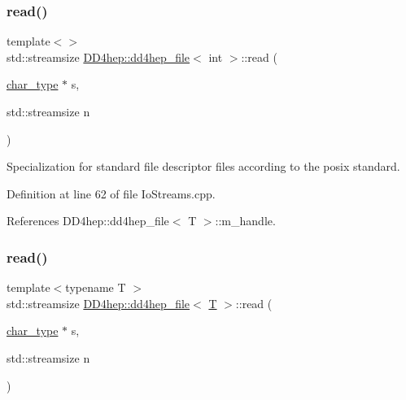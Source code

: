 \hypertarget{class_d_d4hep_1_1dd4hep__file_ac00bb0ccc6724f941f071fb9d2ea76c4}{}\label{class_d_d4hep_1_1dd4hep__file_ac00bb0ccc6724f941f071fb9d2ea76c4} 
\subsubsection{\texorpdfstring{read()}{read()}\hspace{0.1cm}{\footnotesize\ttfamily [1/3]}}
{\footnotesize\ttfamily template$<$$>$ \\
std\+::streamsize \hyperlink{class_d_d4hep_1_1dd4hep__file}{D\+D4hep\+::dd4hep\+\_\+file}$<$ int $>$\+::read (\begin{DoxyParamCaption}\item[{\hyperlink{class_d_d4hep_1_1dd4hep__file_aef4242f7f2fe15a59f7bf7a8f6ba24d5}{char\+\_\+type} $\ast$}]{s,  }\item[{std\+::streamsize}]{n }\end{DoxyParamCaption})}



Specialization for standard file descriptor files according to the posix standard. 



Definition at line 62 of file Io\+Streams.\+cpp.



References D\+D4hep\+::dd4hep\+\_\+file$<$ T $>$\+::m\+\_\+handle.

\hypertarget{class_d_d4hep_1_1dd4hep__file_a3becd552128a6306644b5ff9bd19c493}{}\label{class_d_d4hep_1_1dd4hep__file_a3becd552128a6306644b5ff9bd19c493} 
\subsubsection{\texorpdfstring{read()}{read()}\hspace{0.1cm}{\footnotesize\ttfamily [2/3]}}
{\footnotesize\ttfamily template$<$typename T $>$ \\
std\+::streamsize \hyperlink{class_d_d4hep_1_1dd4hep__file}{D\+D4hep\+::dd4hep\+\_\+file}$<$ \hyperlink{class_t}{T} $>$\+::read (\begin{DoxyParamCaption}\item[{\hyperlink{class_d_d4hep_1_1dd4hep__file_aef4242f7f2fe15a59f7bf7a8f6ba24d5}{char\+\_\+type} $\ast$}]{s,  }\item[{std\+::streamsize}]{n }\end{DoxyParamCaption})}



